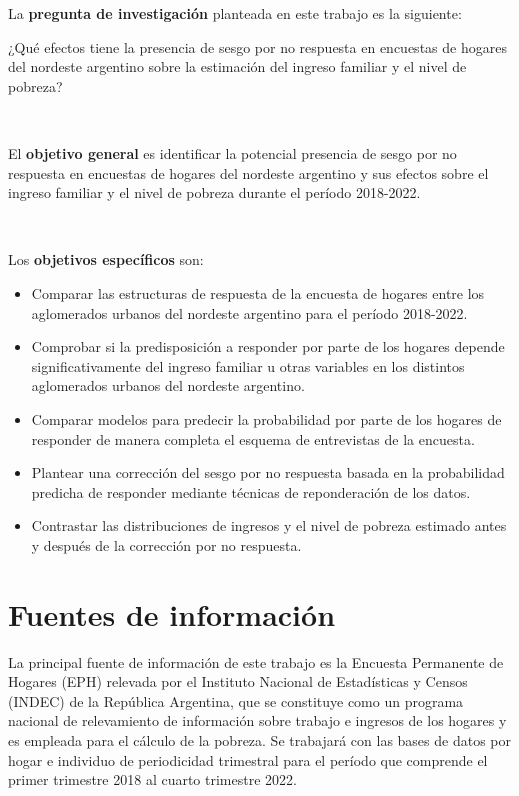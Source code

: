 \documentclass{article}
\begin{document}
La \textbf{pregunta de investigación} planteada en este trabajo es la siguiente:

¿Qué efectos tiene la presencia de sesgo por no respuesta en encuestas de hogares del nordeste argentino sobre la estimación del ingreso familiar y el nivel de pobreza?

\

El \textbf{objetivo general} es identificar la potencial presencia de sesgo por no respuesta en encuestas de hogares del nordeste argentino y sus efectos sobre el ingreso familiar y el nivel de pobreza durante el período 2018-2022.

\

Los \textbf{objetivos específicos} son:

\begin{itemize}
    \item Comparar las estructuras de respuesta de la encuesta de hogares entre los aglomerados urbanos del nordeste argentino para el período 2018-2022.
    \item Comprobar si la predisposición a responder por parte de los hogares depende significativamente del ingreso familiar u otras variables en los distintos aglomerados urbanos del nordeste argentino.
    \item Comparar modelos para predecir la probabilidad por parte de los hogares de responder de manera completa el esquema de entrevistas de la encuesta.
    \item Plantear una corrección del sesgo por no respuesta basada en la probabilidad predicha de responder mediante técnicas de reponderación de los datos.
    \item Contrastar las distribuciones de ingresos y el nivel de pobreza estimado antes y después de la corrección por no respuesta.
\end{itemize}

\section{Fuentes de información}

La principal fuente de información de este trabajo es la Encuesta Permanente de Hogares (EPH) relevada por el Instituto Nacional de Estadísticas y Censos (INDEC) de la República Argentina, que se constituye como un programa nacional de relevamiento de información sobre trabajo e ingresos de los hogares y es empleada para el cálculo de la pobreza. Se trabajará con las bases de datos por hogar e individuo de periodicidad trimestral para el período que comprende el primer trimestre 2018 al cuarto trimestre 2022. 
\end{document}
